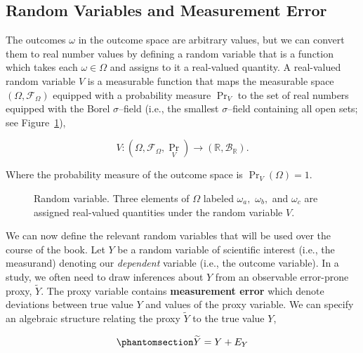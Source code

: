 \documentclass[
  letterpaper,
  DIV=11,
  numbers=noendperiod]{scrreprt}
\begin{document}
\subsection{Random Variables and Measurement
Error}\label{random-variables-and-measurement-error}

The outcomes \(\omega\) in the outcome space are arbitrary values, but
we can convert them to real number values by defining a random variable
that is a function which takes each \(\omega\in\Omega\) and assigns to
it a real-valued quantity. A real-valued random variable \(V\) is a
measurable function that maps the measurable space
\((\Omega,\mathcal{F}_\Omega)\) equipped with a probability measure
\({\Pr}_V\) to the set of real numbers equipped with the Borel
\(\sigma\)--field (i.e., the smallest \(\sigma\)--field containing all
open sets; see Figure~\ref{fig-rv}),

\[
V: (\Omega,\mathcal{F}_\Omega,{\Pr}_V) \rightarrow (\mathbb{R},\mathcal{B}_\mathbb{R}).
\]

Where the probability measure of the outcome space is
\({\Pr}_V(\Omega)=1\).

\begin{figure}[H]


\caption{\label{fig-rv}Random variable. Three elements of \(\Omega\)
labeled \(\omega_a,\) \(\omega_b,\) and \(\omega_c\) are assigned
real-valued quantities under the random variable \(V\).}

\end{figure}%

We can now define the relevant random variables that will be used over
the course of the book. Let \(Y\) be a random variable of scientific
interest (i.e., the measurand) denoting our \emph{dependent} variable
(i.e., the outcome variable). In a study, we often need to draw
inferences about \(Y\) from an observable error-prone proxy,
\(\widetilde{Y}\). The proxy variable contains \textbf{measurement
error} which denote deviations between true value \(Y\) and values of
the proxy variable. We can specify an algebraic structure relating the
proxy \(\widetilde{Y}\) to the true value \(Y\),

\begin{equation}\phantomsection\label{eq-meas-y}{
\widetilde{Y} = Y + E_Y
}\end{equation}
\end{document}
